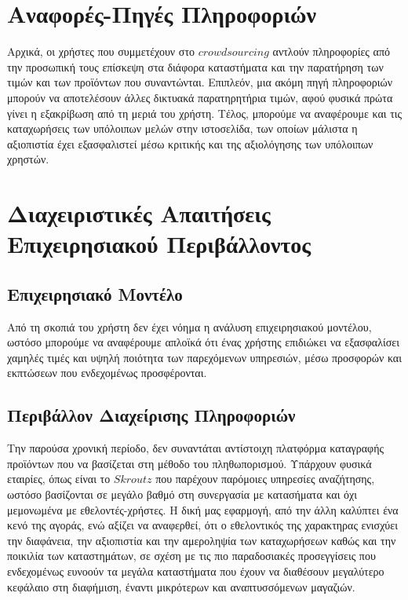\documentclass[12pt]{article}
\begin{document}
\section{Αναφορές-Πηγές Πληροφοριών}

Αρχικά, οι χρήστες που συμμετέχουν στο $crowdsourcing$ αντλούν πληροφορίες από την προσωπική τους επίσκεψη στα διάφορα καταστήματα και την παρατήρηση των τιμών και των προϊόντων που συναντώνται. Επιπλεόν, μια ακόμη πηγή πληροφοριών μπορούν να αποτελέσουν άλλες δικτυακά παρατηρητήρια τιμών, αφού φυσικά πρώτα γίνει η εξακρίβωση από τη μεριά του χρήστη. Τέλος, μπορούμε να αναφέρουμε και τις καταχωρήσεις των υπόλοιπων μελών στην ιστοσελίδα, των οποίων μάλιστα η αξιοπιστία έχει εξασφαλιστεί μέσω κριτικής και της αξιολόγησης των υπόλοιπων χρηστών.

\section{Διαχειριστικές Απαιτήσεις Επιχειρησιακού Περιβάλλοντος}

\subsection{Επιχειρησιακό Μοντέλο}

Από τη σκοπιά του χρήστη δεν έχει νόημα η ανάλυση επιχειρησιακού μοντέλου, ωστόσο μπορούμε να αναφέρουμε απλοϊκά ότι ένας χρήστης επιδιώκει να εξασφαλίσει χαμηλές τιμές και υψηλή ποιότητα των παρεχόμενων υπηρεσιών, μέσω προσφορών και εκπτώσεων που ενδεχομένως προσφέρονται. 

\subsection{Περιβάλλον Διαχείρισης Πληροφοριών}

Την παρούσα χρονική περίοδο, δεν συναντάται αντίστοιχη πλατφόρμα καταγραφής προϊόντων που να βασίζεται στη μέθοδο του πληθωπορισμού. Υπάρχουν φυσικά εταιρίες, όπως είναι το $Skroutz$ που παρέχουν παρόμοιες υπηρεσίες αναζήτησης, ωστόσο βασίζονται σε μεγάλο βαθμό στη συνεργασία με κατασήματα και όχι μεμονωμένα με εθελοντές-χρήστες. Η δική μας εφαρμογή, από την άλλη καλύπτει ένα κενό της αγοράς, ενώ αξίζει να αναφερθεί, ότι ο εθελοντικός της χαρακτηρας ενισχύει την διαφάνεια, την αξιοπιστία και την αμεροληψία των καταχωρήσεων καθώς και την ποικιλία των καταστημάτων, σε σχέση με τις πιο παραδοσιακές προσεγγίσεις που ενδεχομένως ευνοούν τα μεγάλα καταστήματα που έχουν να διαθέσουν μεγαλύτερο κεφάλαιο στη διαφήμιση, έναντι μικρότερων και αναπτυσσόμενων μαγαζιών.
\end{document}
